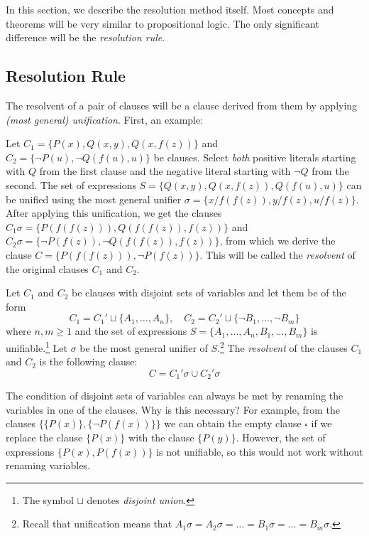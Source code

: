 In this section, we describe the resolution method itself. Most concepts and theorems will be very similar to propositional logic. The only significant difference will be the \emph{resolution rule}.

\subsection{Resolution Rule}

The resolvent of a pair of clauses will be a clause derived from them by applying \emph{(most general) unification}. First, an example:

\begin{example}
Let $C_1=\{P(x),Q(x,y),Q(x,f(z))\}$ and $C_2=\{\neg P(u),\neg Q(f(u),u)\}$ be clauses. Select \emph{both} positive literals starting with $Q$ from the first clause and the negative literal starting with $\neg Q$ from the second. The set of expressions $S=\{Q(x,y),Q(x,f(z)),Q(f(u),u)\}$ can be unified using the most general unifier $\sigma=\{x/f(f(z)),y/f(z),u/f(z)\}$. After applying this unification, we get the clauses $C_1\sigma=\{P(f(f(z))),Q(f(f(z)),f(z))\}$ and $C_2\sigma=\{\neg P(f(z)),\neg Q(f(f(z)),f(z))\}$, from which we derive the clause $C=\{P(f(f(z))),\neg P(f(z))\}$. This will be called the \emph{resolvent} of the original clauses $C_1$ and $C_2$.
\end{example}

\begin{definition}
    Let $C_1$ and $C_2$ be clauses with disjoint sets of variables and let them be of the form
    $$
    C_1=C_1'\sqcup \{A_1,\dots,A_n\},\quad C_2=C_2'\sqcup \{\neg B_1,\dots,\neg B_m\}
    $$
    where $n,m\ge 1$ and the set of expressions $S=\{A_1,\dots,A_n,B_1,\dots,B_m\}$ is unifiable.\footnote{The symbol $\sqcup$ denotes \emph{disjoint union}.} Let $\sigma$ be the most general unifier of $S$.\footnote{Recall that unification means that $A_1\sigma=A_2\sigma=\dots=B_1\sigma=\dots=B_m\sigma$.} The \emph{resolvent} of the clauses $C_1$ and $C_2$ is the following clause:
    $$
    C=C_1'\sigma \cup C_2'\sigma
    $$
\end{definition}

\begin{remark}\label{remark:resolution-step-rename}
    The condition of disjoint sets of variables can always be met by renaming the variables in one of the clauses. Why is this necessary? For example, from the clauses $\{\{P(x)\},\{\neg P(f(x))\}\}$ we can obtain the empty clause $\square$ if we replace the clause $\{P(x)\}$ with the clause $\{P(y)\}$. However, the set of expressions $\{P(x),P(f(x))\}$ is not unifiable, so this would not work without renaming variables.
\end{remark}

